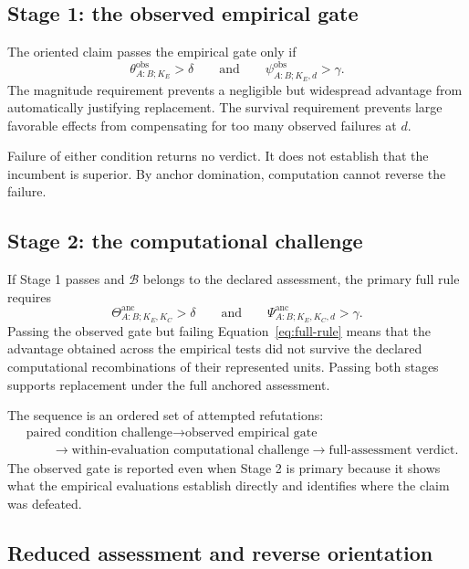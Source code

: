 \documentclass[11pt]{article}
\newcommand{\Boot}{\mathcal{B}}
\newcommand{\Psianc}{\Psi^{\mathrm{anc}}}
\newcommand{\Thetaanc}{\Theta^{\mathrm{anc}}}
\theoremstyle{remark}
\begin{document}
\subsection{Stage 1: the observed empirical gate}

The oriented claim passes the empirical gate only if
\begin{equation}
\theta^{\mathrm{obs}}_{A:B;K_E}>\delta
\qquad\text{and}\qquad
\psi^{\mathrm{obs}}_{A:B;K_E,d}>\gamma.
\label{eq:observed-gate}
\end{equation}
The magnitude requirement prevents a negligible but widespread advantage from
automatically justifying replacement. The survival requirement prevents large
favorable effects from compensating for too many observed failures at $d$.

Failure of either condition returns no verdict. It does not establish that the
incumbent is superior. By anchor domination, computation cannot reverse the
failure.

\subsection{Stage 2: the computational challenge}

If Stage 1 passes and $\Boot$ belongs to the declared assessment, the primary
full rule requires
\begin{equation}
\Thetaanc_{A:B;K_E,K_C}>\delta
\qquad\text{and}\qquad
\Psianc_{A:B;K_E,K_C,d}>\gamma.
\label{eq:full-rule}
\end{equation}
Passing the observed gate but failing Equation~\eqref{eq:full-rule} means that
the advantage obtained across the empirical tests did not survive the declared
computational recombinations of their represented units. Passing both stages
supports replacement under the full anchored assessment.

The sequence is an ordered set of attempted refutations:
\[
\begin{aligned}
&\text{paired condition challenge}
\longrightarrow
\text{observed empirical gate}\\
&\qquad\longrightarrow
\text{within-evaluation computational challenge}
\longrightarrow
\text{full-assessment verdict}.
\end{aligned}
\]
The observed gate is reported even when Stage 2 is primary because it shows
what the empirical evaluations establish directly and identifies where the
claim was defeated.

\subsection{Reduced assessment and reverse orientation}
\end{document}
